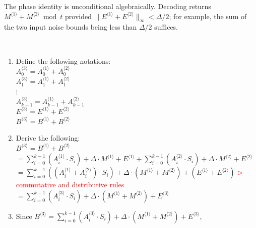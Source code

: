 The phase identity is unconditional algebraically. Decoding returns $M^{\langle1\rangle}+M^{\langle2\rangle}\bmod t$ provided $\|E^{\langle1\rangle}+E^{\langle2\rangle}\|_\infty<\Delta/2$; for example, the sum of the two input noise bounds being less than $\Delta/2$ suffices.

$ $

\begin{myproof}
\begin{enumerate}
\item Define the following notations: \\
$A_0^{\langle 3 \rangle} = A_0^{\langle 1 \rangle} + A_0^{\langle 2 \rangle}$ \\
$A_1^{\langle 3 \rangle} = A_1^{\langle 1 \rangle} + A_1^{\langle 2 \rangle}$ \\
$\vdots$ \\
$A_{k-1}^{\langle 3 \rangle} = A_{k-1}^{\langle 1 \rangle} + A_{k-1}^{\langle 2 \rangle}$ \\
$E^{\langle 3 \rangle} = E^{\langle 1 \rangle} + E^{\langle 2 \rangle}$ \\
$B^{\langle 3 \rangle} = B^{\langle 1 \rangle} + B^{\langle 2 \rangle}$
\item Derive the following: \\
$B^{\langle 3 \rangle} = B^{\langle 1 \rangle} + B^{\langle 2 \rangle}$ \\
$ = \sum\limits_{i=0}^{k-1}{(A_i^{\langle 1 \rangle} \cdot S_i)} + \Delta \cdot M^{\langle 1 \rangle} + E^{\langle 1 \rangle} + \sum\limits_{i=0}^{k-1}{(A_i^{\langle 2 \rangle} \cdot S_i)} + \Delta \cdot M^{\langle 2 \rangle} + E^{\langle 2 \rangle}$ \\ 
$= \sum\limits_{i=0}^{k-1}{((A_i^{\langle 1 \rangle} + A_i^{\langle 2 \rangle}) \cdot S_i)} + \Delta \cdot (M^{\langle 1 \rangle} + M^{\langle 2 \rangle}) + (E^{\langle 1 \rangle} + E^{\langle 2 \rangle})$ \textcolor{red}{ $\rhd$ commutative and distributive rules} \\
$= \sum\limits_{i=0}^{k-1}{(A_i^{\langle 3 \rangle} \cdot S_i)} + \Delta \cdot (M^{\langle 1 \rangle} + M^{\langle 2 \rangle}) + E^{\langle 3 \rangle}$ \\
\item Since $B^{\langle 3 \rangle} = \sum\limits_{i=0}^{k-1}{(A_i^{\langle 3 \rangle} \cdot S_i)} + \Delta \cdot (M^{\langle 1 \rangle} + M^{\langle 2 \rangle}) + E^{\langle 3 \rangle}$, 


\end{enumerate}
\end{myproof}

